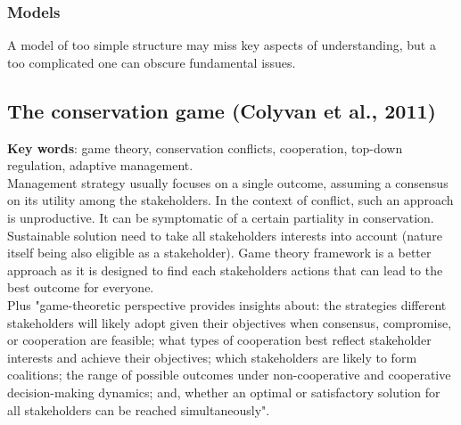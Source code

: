 \documentclass[12pt]{article}
\begin{document}
\subsubsection{Models}

A model of too simple structure may miss key aspects of understanding, but a too complicated one can obscure fundamental issues.

\subsection{The conservation game (Colyvan et al., 2011)}

\textbf{Key words}: game theory, conservation conflicts, cooperation, top-down regulation, adaptive management.\\

Management strategy usually focuses on a single outcome, assuming a consensus on its utility among the stakeholders. In the context of conflict, such an approach is unproductive. It can be symptomatic of a certain partiality in conservation. Sustainable solution need to take all stakeholders interests into account (nature itself being also eligible as a stakeholder). Game theory framework is a better approach as it is designed to find each stakeholders actions that can lead to the best outcome for everyone.\\ 
Plus "game-theoretic perspective provides insights about: the strategies different stakeholders will likely adopt given their objectives when consensus, compromise, or cooperation are feasible; what types of cooperation best reflect stakeholder interests and achieve their objectives; which stakeholders are likely to form coalitions; the range of possible outcomes under non-cooperative and cooperative decision-making dynamics; and, whether an optimal or satisfactory solution for all stakeholders can be reached simultaneously".\\
\end{document}
